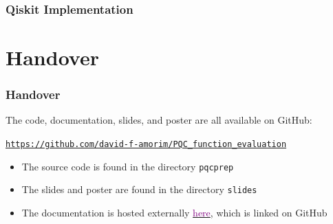 \documentclass{beamer}
\begin{document}
\begin{frame}
\frametitle{Qiskit Implementation}


\end{frame}



\section{Handover}

\begin{frame}

\frametitle{Handover}

The code, documentation, slides, and poster are all available on GitHub:
\begin{center}
\vspace{0.6cm}
\href{https://github.com/david-f-amorim/PQC_function_evaluation}{\texttt{https://github.com/david-f-amorim/PQC\_function\_evaluation}}
\vspace{0.6cm}
\end{center}

\begin{itemize}
\item The source code is found in the directory \alert{\texttt{pqcprep}} 
\item The slides and poster are found in the directory \alert{\texttt{slides}}
\item The documentation is hosted externally  \href{https://david-f-amorim.github.io/PQC_function_evaluation/pqcprep.html}{\textcolor{purple}{here}}, which is linked on GitHub
\end{itemize}

\end{frame}
\end{document}

